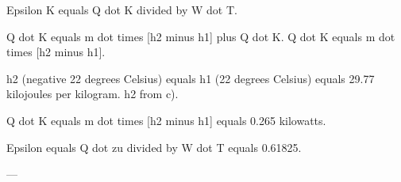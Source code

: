 Epsilon K equals Q dot K divided by W dot T.  

Q dot K equals m dot times [h2 minus h1] plus Q dot K.  
Q dot K equals m dot times [h2 minus h1].  

h2 (negative 22 degrees Celsius) equals h1 (22 degrees Celsius) equals 29.77 kilojoules per kilogram.  
h2 from c).  

Q dot K equals m dot times [h2 minus h1] equals 0.265 kilowatts.  

Epsilon equals Q dot zu divided by W dot T equals 0.61825.  

---